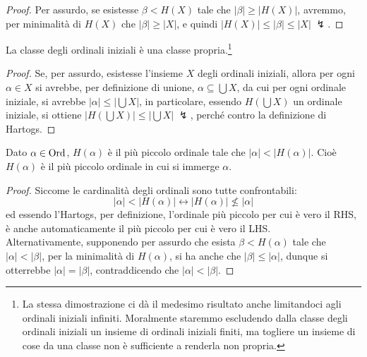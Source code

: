 \begin{proof}
	Per assurdo, se esistesse $\beta < H(X)$ tale che $|\beta| \geq |H(X)|$, avremmo, per minimalità di $H(X)$ che $|\beta| \geq |X|$, e quindi
	$|H(X)| \leq |\beta| \leq |X| \; \lightning$.
\end{proof}

\begin{corollary}
	La classe degli ordinali iniziali è una classe propria.\footnote{La stessa dimostrazione ci dà il medesimo risultato anche limitandoci agli ordinali iniziali infiniti. Moralmente staremmo 
	escludendo dalla classe degli ordinali iniziali un insieme di ordinali iniziali finiti, ma togliere un insieme di cose da una classe non è sufficiente a renderla non propria.}
\end{corollary}

\begin{proof}
	Se, per assurdo, esistesse l'insieme $X$ degli ordinali iniziali, allora per ogni $\alpha \in X$ si avrebbe, per definizione di unione, $\alpha \subseteq \bigcup X$,
	da cui per ogni ordinale iniziale, si avrebbe $|\alpha| \leq \left\lvert  \bigcup X\right\rvert$, in particolare, essendo $H\left(\bigcup X\right)$ un ordinale iniziale, si ottiene $\left\lvert H\left(\bigcup X\right)\right\rvert \leq \left\lvert  \bigcup X\right\rvert \; \lightning$, perché
	contro la definizione di Hartogs.
\end{proof}

\begin{remark}
	Dato $\alpha \in \operatorname{Ord}$, $H(\alpha)$ è il più piccolo ordinale tale che $|\alpha| < |H(\alpha)|$.
	Cioè $H(\alpha)$ è il più piccolo ordinale in cui si immerge $\alpha$.
\end{remark}

\begin{proof}
	Siccome le cardinalità degli ordinali sono tutte confrontabili:
	\[ |\alpha| < |H(\alpha)| \leftrightarrow |H(\alpha)| \not\leq |\alpha|
		\]
	ed essendo l'Hartogs, per definizione, l'ordinale più piccolo per cui è vero il RHS, è anche automaticamente il più piccolo per cui è vero il LHS.\\
	Alternativamente, supponendo per assurdo che esista $\beta < H(\alpha)$ tale che $|\alpha| < |\beta|$, per la minimalità di $H(\alpha)$, si ha anche che $|\beta| \leq |\alpha|$,
	dunque si otterrebbe $|\alpha| = |\beta|$, contraddicendo che $|\alpha| < |\beta|$.
\end{proof}

